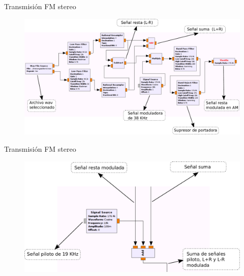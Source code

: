 \begin{frame}{Transmisión FM stereo}

\begin{figure}[H]
\centering
\vspace{-3mm}
\includegraphics[width=\textwidth]{parte3/lab12/pdf/lab12_2.pdf}
\end{figure}
    
\end{frame}

\begin{frame}{Transmisión FM stereo}

\begin{figure}[H]
\centering
\vspace{-3mm}
\includegraphics[width=\textwidth]{parte3/lab12/pdf/lab12_3.pdf}
\end{figure}
    
\end{frame}

